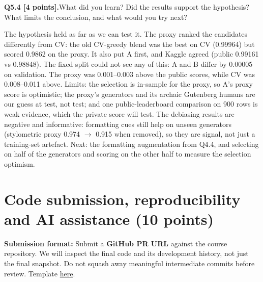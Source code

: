 \documentclass[11pt,letterpaper]{article}
\newcommand{\question}[2]{\needspace{4\baselineskip}\par\addvspace{0.45em}\noindent\textbf{#1}\quad #2\par\nobreak\vspace{0.1em}}
\begin{document}
\question{Q5.4 [4 points].}{What did you learn? Did the results support the hypothesis? What limits the conclusion, and what would you try next?}
The hypothesis held as far as we can test it. The proxy ranked the candidates differently from CV: the old CV-greedy blend was the best on CV (0.99964) but scored 0.9862 on the proxy. It also put A first, and Kaggle agreed (public 0.99161 vs 0.98848). The fixed split could not see any of this: A and B differ by 0.00005 on validation. The proxy was 0.001--0.003 above the public scores, while CV was 0.008--0.011 above. Limits: the selection is in-sample for the proxy, so A's proxy score is optimistic; the proxy's generators and its archaic Gutenberg humans are our guess at test, not test; and one public-leaderboard comparison on 900 rows is weak evidence, which the private score will test. The debiasing results are negative and informative: formatting cues still help on unseen generators (stylometric proxy 0.974 $\to$ 0.915 when removed), so they are signal, not just a training-set artefact. Next: the formatting augmentation from Q4.4, and selecting on half of the generators and scoring on the other half to measure the selection optimism.

\section{Code submission, reproducibility and AI assistance (10 points)}
\textbf{Submission format:} Submit a \textbf{GitHub PR URL} against the course repository. We will inspect the final code and its development history, not just the final snapshot. Do not squash away meaningful intermediate commits before review. Template \href{https://github.com/sekhari/human-or-ai-submissions}{here}.
\end{document}
